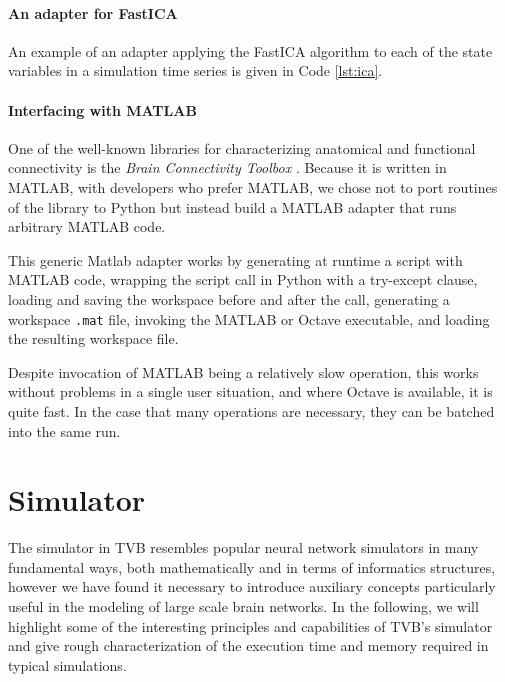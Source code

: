 \documentclass{bioinfo}
\begin{document}
\paragraph{An adapter for FastICA}

An example of an adapter applying the FastICA algorithm to each of the 
state variables in a simulation time series is given in Code \ref{lst:ica}.



\paragraph{Interfacing with MATLAB}

One of the well-known libraries for characterizing anatomical 
and functional connectivity is the \emph{Brain Connectivity Toolbox} 
\citep{Rubinov_2010}. 
Because it is written in MATLAB, with developers who prefer MATLAB, we 
chose not to port routines of the library to Python but instead build
a MATLAB adapter that runs arbitrary MATLAB code. 

This generic Matlab adapter works by generating at runtime a script with MATLAB code, 
wrapping the script call in Python with a try-except clause,  
loading and saving the workspace before and after the call,
generating a workspace \texttt{.mat} file, invoking the MATLAB or Octave
executable, and loading the resulting workspace file. 

Despite invocation of MATLAB being a relatively slow operation, this works
without problems in a single user situation, and where Octave is available, it
is quite fast. In the case that many operations are necessary, they can be
batched into the same run.

\section{Simulator}

The simulator in TVB resembles popular neural network simulators in 
many fundamental ways, both mathematically and in terms of informatics 
structures, however we have found it necessary to introduce auxiliary
concepts particularly useful in the modeling of large scale brain 
networks. In the following, we will highlight some of the interesting
principles and capabilities of TVB's simulator and give rough characterization
of the execution time and memory required in typical simulations.
\end{document}
